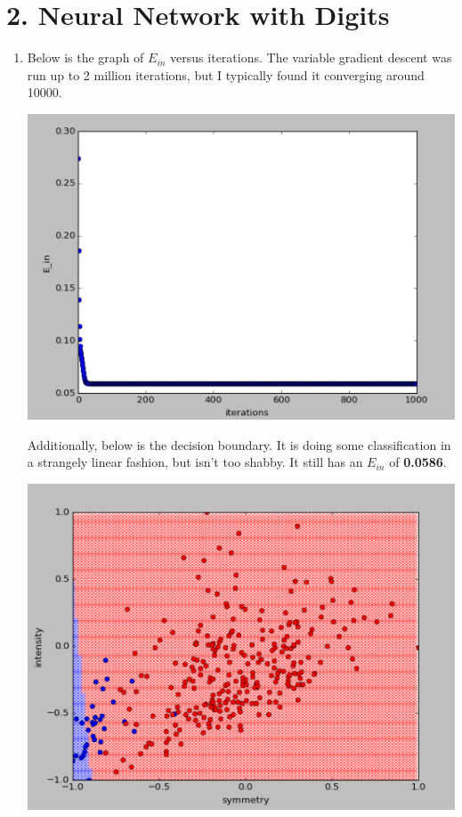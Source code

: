 \documentclass[12pt]{article}
\begin{document}
\section*{2. Neural Network with Digits}
\begin{enumerate}[label=(\alph*)]
	\item Below is the graph of $E_{in}$ versus iterations. The variable gradient descent was run up to 2 million iterations, but I typically found it converging around 10000.
	
	\includegraphics[scale=0.6]{2a1.png}
	
	Additionally, below is the decision boundary. It is doing some classification in a strangely linear fashion, but isn't too shabby. It still has an $E_{in}$ of \textbf{0.0586}.
	
	\includegraphics[scale=0.6]{2a2.png}
	

\end{enumerate}
\end{document}
